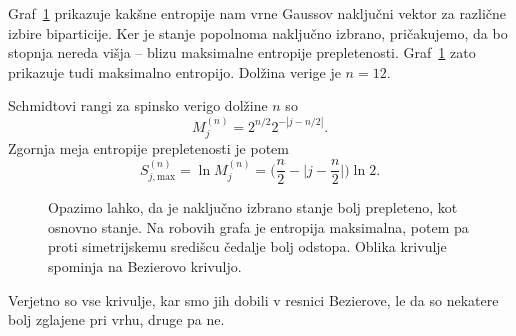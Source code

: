 \documentclass[12pt, a4paper]{article}
\begin{document}
Graf~\ref{2-gaus} prikazuje kak\v sne entropije nam vrne Gaussov naklju\v cni vektor za razli\v cne izbire biparticije.
Ker je stanje popolnoma naklju\v cno izbrano, pri\v cakujemo, da bo stopnja nereda vi\v sja -- blizu maksimalne entropije
prepletenosti. Graf~\ref{2-gaus} zato prikazuje tudi maksimalno entropijo. Dol\v zina verige je $n = 12$.

Schmidtovi rangi za spinsko verigo dol\v zine $n$ so
\[
	M_j^{(n)} = 2^{n/2} 2^{-|j - n/2|}.
\]
Zgornja meja entropije prepletenosti je potem
\[
	S^{(n)}_{j,\text{max}} = \ln M^{(n)}_j = \bigg(\frac{n}{2} - \Big|j - \frac{n}{2}\Big|\bigg)\ln 2.
\]

\begin{figure}[H]\centering
	
	\caption{Opazimo lahko, da je naklju\v cno izbrano stanje bolj prepleteno, kot osnovno stanje. Na robovih
		grafa je entropija maksimalna, potem pa proti simetrijskemu sredi\v scu \v cedalje bolj odstopa.
		Oblika krivulje spominja na Bezierovo krivuljo.}
	\label{2-gaus}
\end{figure}

Verjetno so vse krivulje, kar smo jih dobili v resnici Bezierove, le da so nekatere bolj zglajene pri vrhu, druge pa ne.
\end{document}
